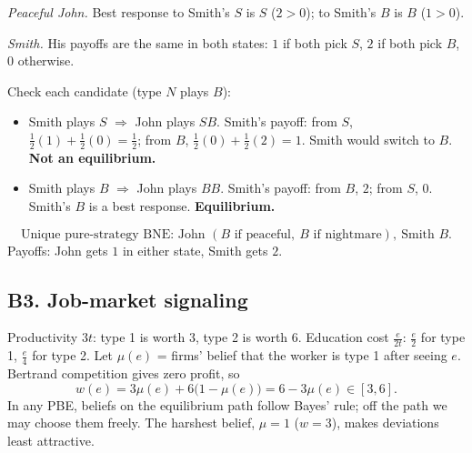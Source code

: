 \documentclass[11pt]{article}
\begin{document}
\emph{Peaceful John.} Best response to Smith's $S$ is $S$ ($2>0$); to Smith's $B$ is $B$ ($1>0$).

\emph{Smith.} His payoffs are the same in both states: $1$ if both pick $S$, $2$ if both pick $B$, $0$ otherwise.

Check each candidate (type $N$ plays $B$):
\begin{itemize}
  \item Smith plays $S$ $\Rightarrow$ John plays $SB$. Smith's payoff: from $S$, $\tfrac12(1)+\tfrac12(0)=\tfrac12$; from $B$, $\tfrac12(0)+\tfrac12(2)=1$. Smith would switch to $B$. \textbf{Not an equilibrium.}
  \item Smith plays $B$ $\Rightarrow$ John plays $BB$. Smith's payoff: from $B$, $2$; from $S$, $0$. Smith's $B$ is a best response. \textbf{Equilibrium.}
\end{itemize}
\[
  \boxed{\text{Unique pure-strategy BNE: John } (B \text{ if peaceful},\ B \text{ if nightmare}),\ \text{Smith } B.}
\]
Payoffs: John gets $1$ in either state, Smith gets $2$.

\subsection*{B3. Job-market signaling}
Productivity $3t$: type 1 is worth $3$, type 2 is worth $6$. Education cost $\tfrac{e}{2t}$: $\tfrac{e}{2}$ for type 1, $\tfrac{e}{4}$ for type 2.
Let $\mu(e)$ = firms' belief that the worker is type 1 after seeing $e$. Bertrand competition gives zero profit, so
\[
  w(e)=3\mu(e)+6\big(1-\mu(e)\big)=6-3\mu(e)\in[3,6].
\]
In any PBE, beliefs on the equilibrium path follow Bayes' rule; off the path we may choose them freely. The harshest belief, $\mu=1$ ($w=3$), makes deviations least attractive.
\end{document}
